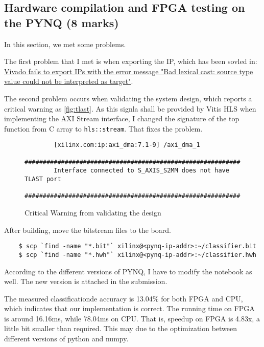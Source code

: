 \subsection{Hardware compilation and FPGA testing on the PYNQ (8 marks)}\label{sec:1f}

In this section, we met some problems.

The first problem that I met is when exporting the IP, which has been sovled in: \href{https://support.xilinx.com/s/question/0D52E00006uxy49SAA/vivado-fails-to-export-ips-with-the-error-message-bad-lexical-cast-source-type-value-could-not-be-interpreted-as-target}{Vivado fails to export IPs with the error message "Bad lexical cast: source type value could not be interpreted as target"}.

The second problem occurs when validating the system design, which reports a critical warning as \autoref{fig:tlast}.
As this signla shall be provided by Vitis HLS when implementing the AXI Stream interface, I changed the signature of the top function from C array to \texttt{hls::stream}.
That fixes the problem.

\begin{figure}
    \begin{verbatim}
        [xilinx.com:ip:axi_dma:7.1-9] /axi_dma_1
        ########################################################### 
        Interface connected to S_AXIS_S2MM does not have TLAST port
        ###########################################################
    \end{verbatim}    
    \caption{Critical Warning from validating the design}
    \label{fig:tlast}
\end{figure}

After building, move the bitstream files to the board.

\begin{verbatim}
    $ scp `find -name "*.bit"` xilinx@<pynq-ip-addr>:~/classifier.bit 
    $ scp `find -name "*.hwh"` xilinx@<pynq-ip-addr>:~/classifier.hwh
\end{verbatim}

According to the different versions of PYNQ, I have to modify the notebook as well.
The new version is attached in the submission.

The measured classificationde accuracy is 13.04\% for both FPGA and CPU, which indicates that our implementation is correct.
The running time on FPGA is around 16.16ms, while 78.04ms on CPU.
That is, speedup on FPGA is 4.83x, a little bit smaller than required.
This may due to the optimization between different versions of python and numpy.
